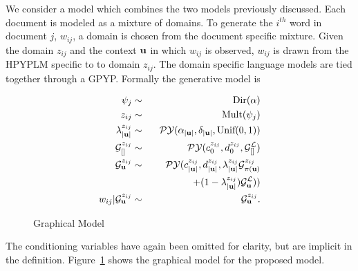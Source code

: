 We consider a model which combines the two models previously discussed.  Each document is modeled as a mixture of domains.  To generate the $i^{th}$ word in document $j$, $w_{ij}$, a domain is chosen from the document specific mixture.  Given the domain $z_{ij}$ and the context $\bu$ in which $w_{ij}$ is observed, $w_{ij}$ is drawn from the HPYPLM specific to to domain $z_{ij}$.  The domain specific language models are tied together through a GPYP.  Formally the generative model is

\begin{eqnarray}
\psi_j  &\sim& \textrm{Dir}(\alpha) \nonumber\\
z_{ij}  &\sim& \textrm{Mult}(\psi_j) \nonumber\\
\lambda^{z_{ij}}_{|\bu|} &\sim& \PY(\alpha_{|\bu|}, \delta_{|\bu|}, \textrm{Unif}(0,1)) \nonumber \\
\G^{z_{ij}}_{[]} &\sim& \PY(c^{ z_{ij}}_0, d^{ z_{ij}}_0,\G^\LA_{[]}) \nonumber \\
\G^{ z_{ij}}_\bu &\sim& \PY(c^{ z_{ij}}_{|\bu|}, d^{ z_{ij}}_{|\bu|}, \lambda^{ z_{ij}}_{|\bu|}\G^{ z_{ij}}_{\pi(\bu)} \nonumber \\
&& \hspace{1.5cm} + (1-\lambda^{ z_{ij}}_{|\bu|})\G^\LA_\bu)) \nonumber \\ 
w_{ij}|\G^{z_{ij}}_\bu  &\sim& \G^{z_{ij}}_\bu \nonumber.
\end{eqnarray}

\begin{figure}[t] 
	\begin{center}
		\caption{Graphical Model}
		\label{fig:graphicalmodel}
	\end{center} 
\end{figure} 

The conditioning variables have again been omitted for clarity, but are implicit in the definition.  Figure~\ref{fig:graphicalmodel} shows the graphical model for the proposed model.

